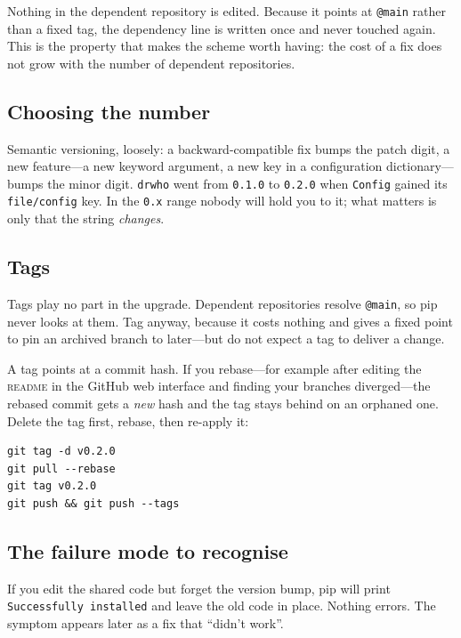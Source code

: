 \documentclass[11pt,a4paper]{article}
\newcommand{\pkg}[1]{\texttt{#1}}
\begin{document}
Nothing in the dependent repository is edited. Because it points at
\texttt{@main} rather than a fixed tag, the dependency line is written once and
never touched again. This is the property that makes the scheme worth having: the
cost of a fix does not grow with the number of dependent repositories.

\subsection{Choosing the number}

Semantic versioning, loosely: a backward-compatible fix bumps the patch digit, a
new feature---a new keyword argument, a new key in a configuration
dictionary---bumps the minor digit. \pkg{drwho} went from \texttt{0.1.0} to
\texttt{0.2.0} when \texttt{Config} gained its \texttt{file/config} key. In the
\texttt{0.x} range nobody will hold you to it; what matters is only that the
string \emph{changes}.

\subsection{Tags}

Tags play no part in the upgrade. Dependent repositories resolve \texttt{@main},
so pip never looks at them. Tag anyway, because it costs nothing and gives a
fixed point to pin an archived branch to later---but do not expect a tag to
deliver a change.

\begin{notebox}
A tag points at a commit hash. If you rebase---for example after editing the
\textsc{readme} in the GitHub web interface and finding your branches
diverged---the rebased commit gets a \emph{new} hash and the tag stays behind on
an orphaned one. Delete the tag first, rebase, then re-apply it:
\begin{lstlisting}[style=sh]
git tag -d v0.2.0
git pull --rebase
git tag v0.2.0
git push && git push --tags
\end{lstlisting}
\end{notebox}

\subsection{The failure mode to recognise}

If you edit the shared code but forget the version bump, pip will print
\texttt{Successfully installed} and leave the old code in place. Nothing errors.
The symptom appears later as a fix that ``didn't work''.
\end{document}
